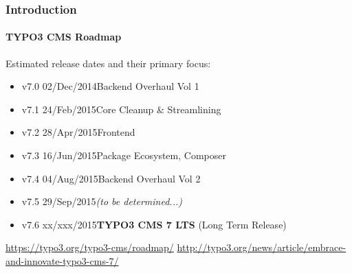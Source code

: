 \begin{frame}[fragile]
	\frametitle{Introduction}
	\framesubtitle{TYPO3 CMS Roadmap}

	Estimated release dates and their primary focus:

	\begin{itemize}
		\item v7.0 \tabto{1.0cm}02/Dec/2014\tabto{3.4cm}Backend Overhaul Vol 1
		\item v7.1 \tabto{1.0cm}24/Feb/2015\tabto{3.4cm}Core Cleanup \& Streamlining
		\item v7.2 \tabto{1.0cm}28/Apr/2015\tabto{3.4cm}Frontend
		\item v7.3 \tabto{1.0cm}16/Jun/2015\tabto{3.4cm}Package Ecosystem, Composer
		\item
			\begingroup
				\color{typo3orange}
					v7.4 \tabto{1.0cm}04/Aug/2015\tabto{3.4cm}Backend Overhaul Vol 2
			\endgroup

		\item v7.5 \tabto{1.0cm}29/Sep/2015\tabto{3.4cm}\textit{(to be determined...)}
		\item v7.6 \tabto{1.0cm}xx/xxx/2015\tabto{3.4cm}\textbf{TYPO3 CMS 7 LTS} (Long Term Release)
	\end{itemize}

	\smaller
		\url{https://typo3.org/typo3-cms/roadmap/}\newline
		\url{http://typo3.org/news/article/embrace-and-innovate-typo3-cms-7/}
	\normalsize

\end{frame}

